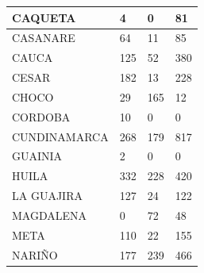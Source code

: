 \documentclass[12pt,a4paper]{article}
\begin{document}
\begin{table}[H]
\begin{tabular}{|llll|}
        \multicolumn{1}{|l|}{CAQUETA}                  & \multicolumn{1}{l|}{4}                 & \multicolumn{1}{l|}{0}               & 81            \\ \hline
        \multicolumn{1}{|l|}{CASANARE}                 & \multicolumn{1}{l|}{64}                & \multicolumn{1}{l|}{11}              & 85            \\ \hline
        \multicolumn{1}{|l|}{CAUCA}                    & \multicolumn{1}{l|}{125}               & \multicolumn{1}{l|}{52}              & 380           \\ \hline
        \multicolumn{1}{|l|}{CESAR}                    & \multicolumn{1}{l|}{182}               & \multicolumn{1}{l|}{13}              & 228           \\ \hline
        \multicolumn{1}{|l|}{CHOCO}                    & \multicolumn{1}{l|}{29}                & \multicolumn{1}{l|}{165}             & 12            \\ \hline
        \multicolumn{1}{|l|}{CORDOBA}                  & \multicolumn{1}{l|}{10}                & \multicolumn{1}{l|}{0}               & 0             \\ \hline
        \multicolumn{1}{|l|}{CUNDINAMARCA}             & \multicolumn{1}{l|}{268}               & \multicolumn{1}{l|}{179}             & 817           \\ \hline
        \multicolumn{1}{|l|}{GUAINIA}                  & \multicolumn{1}{l|}{2}                 & \multicolumn{1}{l|}{0}               & 0             \\ \hline
        \multicolumn{1}{|l|}{HUILA}                    & \multicolumn{1}{l|}{332}               & \multicolumn{1}{l|}{228}             & 420           \\ \hline
        \multicolumn{1}{|l|}{LA GUAJIRA}               & \multicolumn{1}{l|}{127}               & \multicolumn{1}{l|}{24}              & 122           \\ \hline
        \multicolumn{1}{|l|}{MAGDALENA}                & \multicolumn{1}{l|}{0}                 & \multicolumn{1}{l|}{72}              & 48            \\ \hline
        \multicolumn{1}{|l|}{META}                     & \multicolumn{1}{l|}{110}               & \multicolumn{1}{l|}{22}              & 155           \\ \hline
        \multicolumn{1}{|l|}{NARIÑO}                   & \multicolumn{1}{l|}{177}               & \multicolumn{1}{l|}{239}             & 466           \\ \hline

\end{tabular}
\end{table}
\end{document}
